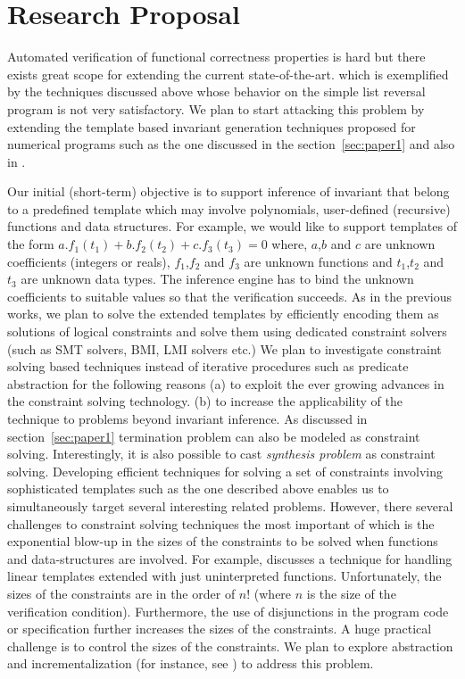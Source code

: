 \section{Research Proposal}

Automated verification of functional correctness properties is hard but there
exists great scope for extending the current state-of-the-art.
which is exemplified by the techniques discussed above whose behavior on the 
simple list reversal program is not very satisfactory.
We plan to start attacking this problem by extending the template based invariant generation 
techniques  proposed for numerical programs such as the one discussed in the 
section~\ref{sec:paper1} and also in \cite{ssriram:SAS04,ssriram:CAV03}. 

Our initial (short-term) objective is to support inference of invariant that belong to a predefined
template which may involve polynomials, user-defined (recursive) functions 
and data structures. For example, we would like to support templates of the form 
$a.f_1(t_1) + b.f_2(t_2) + c.f_3(t_3) = 0$ where, $a$,$b$ and $c$ are unknown coefficients (integers or reals),
$f_1$,$f_2$ and $f_3$ are unknown functions and $t_1$,$t_2$ and $t_3$ are unknown data types.
The inference engine has to bind the unknown coefficients to suitable values so that the verification 
succeeds. 
As in the previous works, we plan to solve the extended templates by efficiently encoding them as
solutions of logical constraints and solve them using dedicated constraint solvers 
(such as SMT solvers, BMI, LMI solvers etc.)
We plan to investigate constraint solving based techniques instead of iterative procedures such
as predicate abstraction for the following reasons 
(a) to exploit the ever growing advances in the constraint solving technology.
(b) to increase the applicability of the technique to problems beyond invariant inference. 
As discussed in section~\ref{sec:paper1} termination problem can also be modeled as constraint solving. 
Interestingly, it is also possible to cast \emph{synthesis problem} as constraint solving.
Developing efficient techniques for solving a set of constraints involving sophisticated
templates such as the one described above enables us to simultaneously target several interesting
related problems.
However, there several challenges to constraint solving techniques the most important of
which is the exponential blow-up in the sizes of the constraints to be solved when 
functions and data-structures are involved.
For example, \cite{dirk:VMCAI07} discusses a technique for handling linear templates extended with
just uninterpreted functions. Unfortunately, the sizes of the constraints are in the order of $n!$
(where $n$ is the size of the verification condition). 
Furthermore, the use of disjunctions in the program code or specification further increases 
the sizes of the constraints.
A huge practical challenge is to control the sizes of the constraints.
We plan to explore abstraction  and incrementalization (for instance, see \cite{}) to address this problem.

